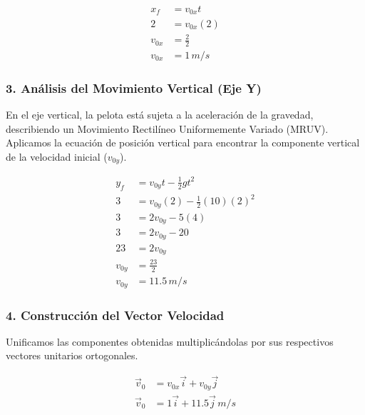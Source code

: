 \documentclass[12pt, a4paper]{article}
\begin{document}
\begin{align*}
x_f &= v_{0x} t \\
2 &= v_{0x} (2) \\
v_{0x} &= \frac{2}{2} \\
v_{0x} &= 1 \, \si{m/s}
\end{align*}

\subsubsection*{3. Análisis del Movimiento Vertical (Eje Y)}
En el eje vertical, la pelota está sujeta a la aceleración de la gravedad, describiendo un Movimiento Rectilíneo Uniformemente Variado (MRUV). Aplicamos la ecuación de posición vertical para encontrar la componente vertical de la velocidad inicial ($v_{0y}$).

\begin{align*}
y_f &= v_{0y} t - \frac{1}{2} g t^2 \\
3 &= v_{0y} (2) - \frac{1}{2} (10) (2)^2 \\
3 &= 2v_{0y} - 5(4) \\
3 &= 2v_{0y} - 20 \\
23 &= 2v_{0y} \\
v_{0y} &= \frac{23}{2} \\
v_{0y} &= 11.5 \, \si{m/s}
\end{align*}

\subsubsection*{4. Construcción del Vector Velocidad}
Unificamos las componentes obtenidas multiplicándolas por sus respectivos vectores unitarios ortogonales.

\begin{align*}
\vec{v}_0 &= v_{0x}\vec{i} + v_{0y}\vec{j} \\
\vec{v}_0 &= 1\vec{i} + 11.5\vec{j} \, \si{m/s}
\end{align*}
\end{document}
